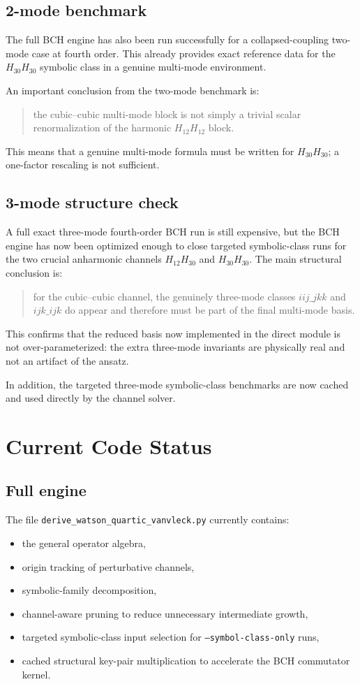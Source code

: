 \documentclass[11pt,a4paper]{article}
\begin{document}
\subsection{2-mode benchmark}
The full BCH engine has also been run successfully for a collapsed-coupling two-mode case at fourth order. This already provides exact reference data for the \(H_{30}H_{30}\) symbolic class in a genuine multi-mode environment.

An important conclusion from the two-mode benchmark is:
\begin{quote}
the cubic--cubic multi-mode block is not simply a trivial scalar renormalization of the harmonic \(H_{12}H_{12}\) block.
\end{quote}
This means that a genuine multi-mode formula must be written for \(H_{30}H_{30}\); a one-factor rescaling is not sufficient.

\subsection{3-mode structure check}
A full exact three-mode fourth-order BCH run is still expensive, but the BCH engine has now been optimized enough to close targeted symbolic-class runs for the two crucial anharmonic channels \(H_{12}H_{30}\) and \(H_{30}H_{30}\). The main structural conclusion is:
\begin{quote}
for the cubic--cubic channel, the genuinely three-mode classes \(iij\_jkk\) and \(ijk\_ijk\) do appear and therefore must be part of the final multi-mode basis.
\end{quote}
This confirms that the reduced basis now implemented in the direct module is not over-parameterized: the extra three-mode invariants are physically real and not an artifact of the ansatz.

In addition, the targeted three-mode symbolic-class benchmarks are now cached and used directly by the channel solver.

\section{Current Code Status}
\subsection{Full engine}
The file
\texttt{derive\_watson\_quartic\_vanvleck.py}
currently contains:
\begin{itemize}[leftmargin=*]
\item the general operator algebra,
\item origin tracking of perturbative channels,
\item symbolic-family decomposition,
\item channel-aware pruning to reduce unnecessary intermediate growth,
\item targeted symbolic-class input selection for \texttt{--symbol-class-only} runs,
\item cached structural key-pair multiplication to accelerate the BCH commutator kernel.
\end{itemize}
\end{document}
